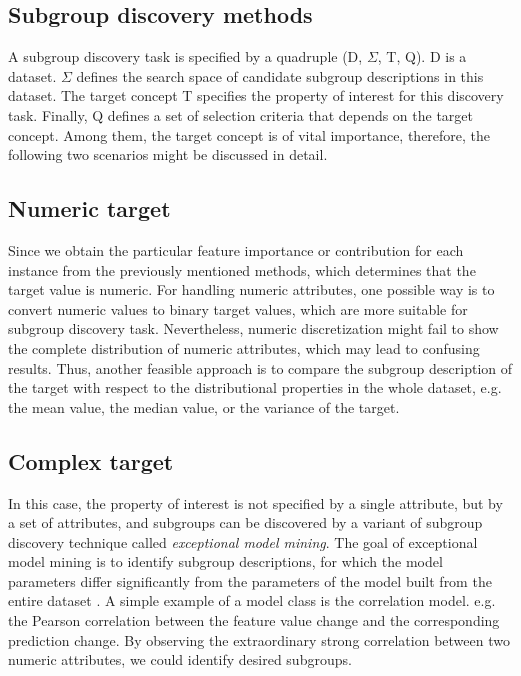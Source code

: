 \documentclass[runningheads]{llncs}
\begin{document}
	\subsection{Subgroup discovery methods}
	
	A subgroup discovery task is specified by a quadruple (D, $\Sigma$, T, Q). D is a dataset. $\Sigma$ defines the search space of candidate subgroup descriptions in this dataset. The target concept T specifies the property of interest for this discovery task. Finally, Q defines a set of selection criteria that depends on the target concept. Among them, the target concept is of vital importance, therefore, the following two scenarios might be discussed in detail.
	
	\subsection{Numeric target }
	
	Since we obtain the particular feature importance or contribution for each instance from the previously mentioned methods, which determines that the target value is numeric. For handling numeric attributes, one possible way is to convert numeric values to binary target values, which are more suitable for subgroup discovery task. Nevertheless, numeric discretization might fail to show the complete distribution of numeric attributes, which may lead to confusing results. Thus, another feasible approach is to compare the subgroup description of the target with respect to the distributional properties in the whole dataset, e.g. the mean value, the median value, or the variance of the target.
	
	\subsection{Complex target }
	
	In this case, the property of interest is not specified by a single attribute, but by a set of attributes, and subgroups can be discovered by a variant of subgroup discovery technique called \textit{exceptional model mining}. The goal of exceptional model mining is to identify subgroup descriptions, for which the model parameters differ significantly from the parameters of the model built from the entire dataset \cite{leman2008exceptional}. A simple example of a model class is the correlation model. e.g. the Pearson correlation between the feature value change and the corresponding prediction change. By observing the extraordinary strong correlation between two numeric attributes, we could identify desired subgroups. 
	
\end{document}
